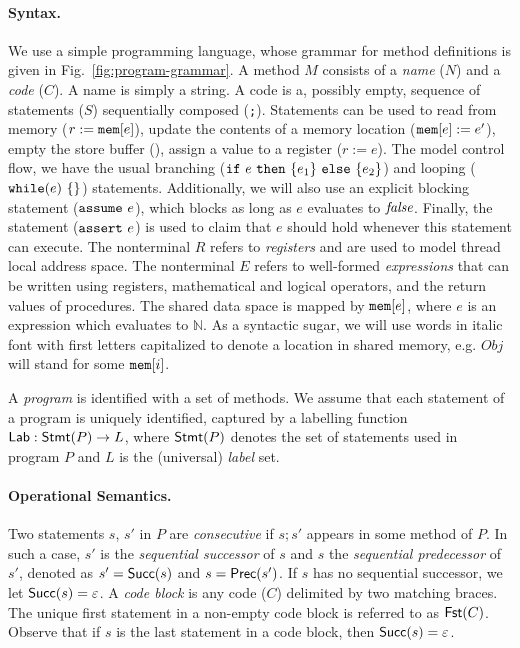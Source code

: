 \paragraph{Syntax.}
We use a simple programming language, whose grammar for method definitions is given in Fig.~\ref{fig:program-grammar}.
A method $M$ consists of a {\em name} ($N$) and a {\em code} ($C$).
A name is simply a string.
A code is a, possibly empty, sequence of statements ($S$) sequentially composed ({\tt ;}).
Statements can be used to read from memory ($r := \mathtt{mem}[e]$), update the contents of a memory location ($\mathtt{mem}[e] := e'$), empty the store buffer (\alifence), assign a value to a register ($r := e$).
The model control flow, we have the usual branching ($\mathtt{if}\ e\ \mathtt{then}\ \{e_1\}\ \mathtt{else}\ \{e_2\}$) and looping ($\aliwhilex e$) statements.
Additionally, we will also use an explicit blocking statement ($\mathtt{assume}\ e$), which blocks as long as $e$ evaluates to $\mathit{false}$.
Finally, the statement ($\mathtt{assert}\ e$) is used to claim that $e$ should hold whenever this statement can execute.
The nonterminal $R$ refers to {\em registers} and are used to model thread local address space.
The nonterminal $E$ refers to well-formed {\em expressions} that can be written using registers, mathematical and logical operators, and the return values of procedures.
The shared data space is mapped by $\mathtt{mem}[e]$, where $e$ is an expression which evaluates to $\mathbb{N}$.
As a syntactic sugar, we will use words in italic font with first letters capitalized to denote a location in shared memory, e.g. $Obj$ will stand for some $\mathtt{mem}[i]$.

A {\em program} is identified with a set of methods.
We assume that each statement of a program is uniquely identified, captured by a labelling function $\mathsf{Lab}: \mathsf{Stmt}(P) \rightarrow L$, where $\mathsf{Stmt}(P)$ denotes the set of statements used in program $P$ and $L$ is the (universal) {\em label} set.

\paragraph{Operational Semantics.}

Two statements $s$, $s'$ in $P$ are {\em consecutive} if $s\mathtt{;}s'$ appears in some method of $P$.
In such a case, $s'$ is the {\em sequential successor} of $s$ and $s$ the {\em sequential predecessor} of $s'$, denoted as $s'=\mathsf{Succ}(s)$ and $s=\mathsf{Prec}(s')$.
If $s$ has no sequential successor, we let $\mathsf{Succ}(s)=\varepsilon$.
A {\em code block} is any code ($C$) delimited by two matching braces.
The unique first statement in a non-empty code block is referred to as $\mathsf{Fst}(C)$.
Observe that if $s$ is the last statement in a code block, then $\mathsf{Succ}(s)=\varepsilon$.

